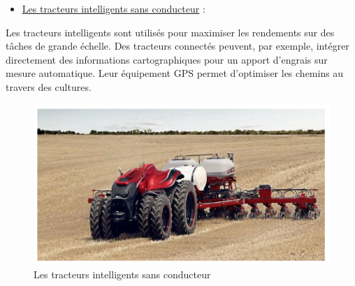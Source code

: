 \begin{flushleft}
		\begin{itemize}
			\item \underline{Les tracteurs intelligents sans conducteur} :
		\end{itemize}
	Les tracteurs intelligents sont utilisés pour maximiser les rendements sur des tâches de grande échelle. Des tracteurs connectés peuvent, par exemple, intégrer directement des informations cartographiques pour un apport d’engrais
	sur mesure automatique. Leur équipement GPS permet d’optimiser les chemins au travers des cultures.
	\begin{figure}[h]
		\centering
		\includegraphics{chapitres/images/tracteurs-intelligents.PNG}
		\caption{Les tracteurs intelligents sans conducteur}
		\label{fig:labelname}
	\end{figure}
	
	
\end{flushleft}
\newpage


